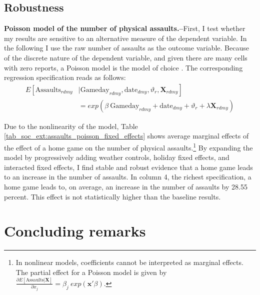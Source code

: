 \documentclass[11pt, a4paper, draft]{article} %
\begin{document}
\newpage
\subsection{Robustness}
\textbf{Poisson model of the number of physical assaults.--}First, I test whether my results are sensitive to an alternative measure of the dependent variable. In the following I use the raw number of assaults as the outcome variable. Because of the discrete nature of the dependent variable, and given there are many cells with zero reports, a Poisson model is the model of choice \citep{lindo2018college}. The corresponding regression specification reads as follows:
\begin{align}
E\left[ \text{Assaults}_{rdmy}\right.&|\left.\text{Gameday}_{rdmy},\text{date}_{dmy},\vartheta_r, \mathbf{X}_{rdmy}  \right] \nonumber \\ &=  exp\left( \beta\ \text{Gameday}_{rdmy} + \text{date}_{dmy} + \vartheta_r + \lambda\mathbf{X}_{rdmy} \right) 
\label{eq_soc_ext:poisson_model}
\end{align}

Due to the nonlinearity of the model, Table \ref{tab_soc_ext:assaults_poisson_fixed_effects} shows average marginal effects of the effect of a home game on the number of physical assaults.\footnote{In nonlinear models, coefficients cannot be interpreted as marginal effects. The partial effect for a Poisson model is given by $\frac{\partial E\left[ \text{Assaults}| \mathbf{X}\right]}{\partial x_j} = \beta_j\ exp(\mathbf{x'}\beta)$.} By expanding the model by progressively adding weather controls, holiday fixed effects, and interacted fixed effects, I find stable and robust evidence that a home game leads to an increase in the number of assaults. In column 4, the richest specification, a home game leads to, on average, an increase in the number of assaults by 28.55 percent. This effect is not statistically higher than the baseline results. 




\bigskip
\section{Concluding remarks}\label{sec_soc_ext:conclusion}




\newpage
\end{document}
